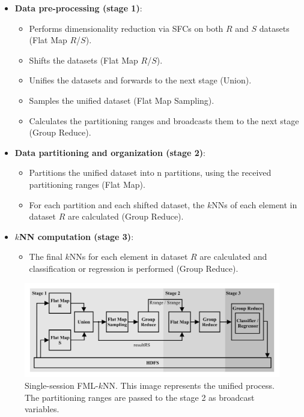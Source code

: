\begin{itemize}
	\item \textbf{Data pre-processing (stage 1)}:
	\begin{itemize}
		\item Performs dimensionality reduction via SFCs on both $R$ and $S$ datasets (Flat Map $R$/$S$).
		\item Shifts the datasets (Flat Map $R$/$S$).
		\item Unifies the datasets and forwards to the next stage (Union).
		\item Samples the unified dataset (Flat Map Sampling).
		\item Calculates the partitioning ranges and broadcasts them to the next stage (Group Reduce).
	\end{itemize}
	\item \textbf{Data partitioning and organization (stage 2)}:
	\begin{itemize}
		\item Partitions the unified dataset into n partitions, using the received partitioning ranges (Flat Map).
		\item For each partition and each shifted dataset, the $k$NNs of each element in dataset $R$ are calculated (Group Reduce).
	\end{itemize}
	\item \textbf{$k$NN computation (stage 3)}:
	\begin{itemize}
		\item The final $k$NNs for each element in dataset $R$ are calculated and classification or regression is performed (Group Reduce).
	\end{itemize}
\end{itemize}

\begin{figure}[h!]
	\centering
	\includegraphics[width=\textwidth]{figures/figure4.png}
	\caption{Single-session FML-$k$NN. This image represents the unified process. The partitioning ranges are passed to the stage 2 as broadcast variables.}
	\label{figure4}
\end{figure}

